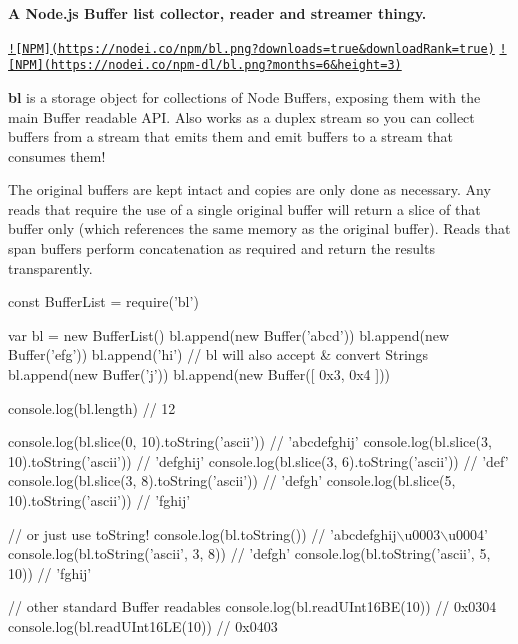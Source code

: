 {\bfseries A Node.\+js Buffer list collector, reader and streamer thingy.}

\href{https://nodei.co/npm/bl/}{\tt !\mbox{[}N\+P\+M\mbox{]}(https\+://nodei.\+co/npm/bl.\+png?downloads=true\&download\+Rank=true)} \href{https://nodei.co/npm/bl/}{\tt !\mbox{[}N\+P\+M\mbox{]}(https\+://nodei.\+co/npm-\/dl/bl.\+png?months=6\&height=3)}

{\bfseries bl} is a storage object for collections of Node Buffers, exposing them with the main Buffer readable A\+P\+I. Also works as a duplex stream so you can collect buffers from a stream that emits them and emit buffers to a stream that consumes them!

The original buffers are kept intact and copies are only done as necessary. Any reads that require the use of a single original buffer will return a slice of that buffer only (which references the same memory as the original buffer). Reads that span buffers perform concatenation as required and return the results transparently.


\begin{DoxyCode}
\textcolor{keyword}{const} BufferList = require(\textcolor{stringliteral}{'bl'})

var bl = new BufferList()
bl.append(new Buffer('abcd'))
bl.append(new Buffer('efg'))
bl.append('hi')                     \textcolor{comment}{// bl will also accept & convert Strings}
bl.append(new Buffer('j'))
bl.append(new Buffer([ 0x3, 0x4 ]))

console.log(bl.length) \textcolor{comment}{// 12}

console.log(bl.slice(0, 10).toString('ascii')) \textcolor{comment}{// 'abcdefghij'}
console.log(bl.slice(3, 10).toString('ascii')) \textcolor{comment}{// 'defghij'}
console.log(bl.slice(3, 6).toString('ascii'))  \textcolor{comment}{// 'def'}
console.log(bl.slice(3, 8).toString('ascii'))  \textcolor{comment}{// 'defgh'}
console.log(bl.slice(5, 10).toString('ascii')) \textcolor{comment}{// 'fghij'}

\textcolor{comment}{// or just use toString!}
console.log(bl.toString())               \textcolor{comment}{// 'abcdefghij\(\backslash\)u0003\(\backslash\)u0004'}
console.log(bl.toString('ascii', 3, 8))  \textcolor{comment}{// 'defgh'}
console.log(bl.toString('ascii', 5, 10)) \textcolor{comment}{// 'fghij'}

\textcolor{comment}{// other standard Buffer readables}
console.log(bl.readUInt16BE(10)) \textcolor{comment}{// 0x0304}
console.log(bl.readUInt16LE(10)) \textcolor{comment}{// 0x0403}
\end{DoxyCode}


